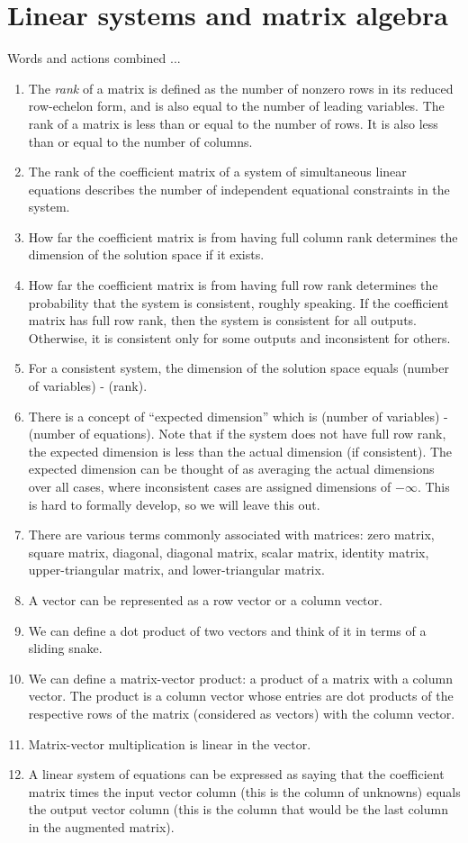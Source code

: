 \documentclass[10pt]{amsart}
\begin{document}
\section{Linear systems and matrix algebra}

Words and actions combined ...

\begin{enumerate}
\item The {\em rank} of a matrix is defined as the number of nonzero
  rows in its reduced row-echelon form, and is also equal to the
  number of leading variables. The rank of a matrix is less than or
  equal to the number of rows. It is also less than or equal to the
  number of columns.
\item The rank of the coefficient matrix of a system of simultaneous
  linear equations describes the number of independent equational
  constraints in the system.
\item How far the coefficient matrix is from having full column rank
  determines the dimension of the solution space if it exists.
\item How far the coefficient matrix is from having full row rank
  determines the probability that the system is consistent, roughly
  speaking. If the coefficient matrix has full row rank, then the
  system is consistent for all outputs. Otherwise, it is consistent
  only for some outputs and inconsistent for others.
\item For a consistent system, the dimension of the solution space
  equals (number of variables) - (rank).
\item There is a concept of ``expected dimension'' which is (number of
  variables) - (number of equations). Note that if the system does not
  have full row rank, the expected dimension is less than the actual
  dimension (if consistent). The expected dimension can be thought of
  as averaging the actual dimensions over all cases, where
  inconsistent cases are assigned dimensions of $-\infty$. This is
  hard to formally develop, so we will leave this out.
\item There are various terms commonly associated with matrices: zero
  matrix, square matrix, diagonal, diagonal matrix, scalar matrix,
  identity matrix, upper-triangular matrix, and lower-triangular
  matrix.
\item A vector can be represented as a row vector or a column vector.
\item We can define a dot product of two vectors and think of it in
  terms of a sliding snake.
\item We can define a matrix-vector product: a product of a matrix
  with a column vector. The product is a column vector whose entries
  are dot products of the respective rows of the matrix (considered as
  vectors) with the column vector.
\item Matrix-vector multiplication is linear in the vector.
\item A linear system of equations can be expressed as saying that the
  coefficient matrix times the input vector column (this is the column
  of unknowns) equals the output vector column (this is the column
  that would be the last column in the augmented matrix).
\end{enumerate}
\end{document}
